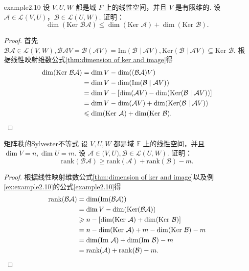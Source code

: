 \documentclass[12pt, a4paper,newtx]{ctexart}
\begin{document}
\begin{example}{}{example2.10}
	设 $V, U, W$ 都是域 $F$ 上的线性空间，并且 $V$ 是有限维的. 设 $\mathcal{A} \in \mathcal{L}(V, U)$，$\mathcal{B} \in \mathcal{L}(U, W)$. 证明：
	\begin{equation}\label{example2.10}
		\dim(\text{Ker } \mathcal{BA}) \leqslant \dim(\text{Ker } \mathcal{A}) + \dim(\text{Ker } \mathcal{B}). 
	\end{equation}
\end{example}
\begin{proof}
	首先$\mathcal{BA} \in \mathcal{L}(V, W),\mathcal{BA}V = \mathcal{B}(\mathcal{A}V) = \text{Im}(\mathcal{B}\mid {\mathcal{A}V}), \text{Ker}(\mathcal{B}\mid {\mathcal{A}V}) \subseteq \text{Ker } \mathcal{B}$. 根据线性映射维数公式\ref{thm:dimension of ker and image}得\begin{align*}
		\dim(\text{Ker } \mathcal{BA}) &= \dim V - \dim((\mathcal{BA})V) \\&= \dim V - \dim(\text{Im}(\mathcal{B}\mid{\mathcal{A}V})) \\
		&= \dim V - [\dim(\mathcal{A}V) - \dim(\text{Ker}(\mathcal{B}\mid {\mathcal{A}V}))] \\
		&= \dim V - \dim(\mathcal{A}V) + \dim(\text{Ker}(\mathcal{B}\mid{\mathcal{A}V})) \\
		&\leqslant \dim(\text{Ker } \mathcal{A}) + \dim(\text{Ker } \mathcal{B}).\qedhere
	\end{align*}
\end{proof}
\begin{example}{矩阵秩的Sylvester不等式}{}
	设 $V, U, W$ 都是域 $\mathbb F$ 上的线性空间，并且 $\dim V = n, \dim U = m$. 设 $\mathcal{A} \in \mathcal (V, U), \mathcal{B} \in \mathcal L(U, W)$. 证明：
	\begin{equation}
		\text{rank}(\mathcal{BA}) \geqslant \text{rank}(\mathcal{A}) + \text{rank}(\mathcal{B}) - m. 
	\end{equation}
\end{example}
\begin{proof}
	根据线性映射维数公式\ref{thm:dimension of ker and image}以及例\ref{ex:example2.10}的公式\eqref{example2.10}得
	\begin{align*}
		\text{rank}(\mathcal{BA}) &= \dim(\text{Im}(\mathcal{BA})) \\
		&= \dim V - \dim(\text{Ker}(\mathcal{BA})) \\
		&\geqslant n - [\dim(\text{Ker } \mathcal{A}) + \dim(\text{Ker } \mathcal{B})] \\
		&= n - \dim(\text{Ker } \mathcal{A}) + m - \dim(\text{Ker } \mathcal{B}) - m \\
		&= \dim(\text{Im } \mathcal{A}) + \dim(\text{Im } \mathcal{B}) - m \\
		&= \text{rank}(\mathcal{A}) + \text{rank}(\mathcal{B}) - m.\qedhere
	\end{align*}
\end{proof}
\end{document}
